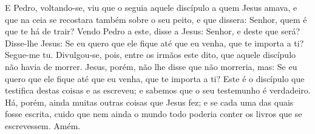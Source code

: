 E Pedro, voltando-se, viu que o seguia aquele discípulo a quem
Jesus amava, e que na ceia se recostara também sobre o seu peito, e
que dissera: Senhor, quem é que te há de trair? Vendo Pedro a
este, disse a Jesus: Senhor, e deste que será? Disse-lhe
Jesus: Se eu quero que ele fique até que eu venha, que te importa a
ti? Segue-me tu. Divulgou-se, pois, entre os irmãos este
dito, que aquele discípulo não havia de morrer. Jesus, porém, não
lhe disse que não morreria, mas: Se eu quero que ele fique até que
eu venha, que te importa a ti? Este é o discípulo que
testifica destas coisas e as escreveu; e sabemos que o seu
testemunho é verdadeiro. Há, porém, ainda muitas outras
coisas que Jesus fez; e se cada uma das quais fosse escrita, cuido
que nem ainda o mundo todo poderia conter os livros que se
escrevessem. Amém.

